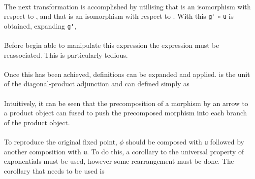 \begin{AgdaMultiCode}
\\
The next transformation is accomplished by utilising that 
is an isomorphism with respect to , and that
 is an isomorphism with respect to
. With this \verb|g'| $\circ$ \verb|u| is obtained,
expanding \verb|g'|, \\
\\
Before begin able to manipulate this expression the expression must be
reassociated. This is particularly tedious.\\

\\
Once this has been achieved, definitions can be expanded and applied.
\AgdaFunction{$\delta$} is the unit of the diagonal-product adjunction and can
defined simply as \\
 \\
Intuitively, it can be seen that the precomposition of a morphism by an arrow to
a product object can fused to push the precomposed morphism into each branch of
the product object.
\\
 \\
To reproduce the original fixed point, $\phi$ should be composed with \verb|u|
followed by another composition with \verb|u|. To do this, a corollary to the
universal property of exponentials must be used, however some rearrangement must
be done. The corollary that needs to be used is 


\end{AgdaMultiCode}
